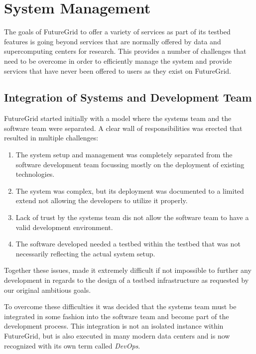 
\section{System Management}

The goals of FutureGrid to offer a variety of services as part of its
testbed features is going beyond services that are normally offered by
data and supercomputing centers for research. This provides a number
of challenges that need to be overcome in order to efficiently manage
the system and provide services that have never been offered to users
as they exist on FutureGrid.

\subsection{Integration of Systems and Development Team}

FutureGrid started initially with a model where the systems team and
the software team were separated. A clear wall of responsibilities was
erected that resulted in multiple challenges:

\begin{enumerate}

\item
The system setup and management was completely separated from
the software development team focussing mostly on the deployment of
existing technologies. 

\item
The system was complex, but its deployment was documented to a limited
extend not allowing the developers to utilize it properly.

\item 
Lack of trust by the systems team dis not allow the software team to
have a valid development environment.

\item
The software developed needed a testbed within the
testbed that was not necessarily reflecting the actual system setup.

\end{enumerate}

Together these issues, made it extremely difficult if not impossible to
further any development in regards to the design of a testbed
infrastructure as requested by our original ambitious goals. 

To overcome these difficulties it was decided that the systems team
must be integrated in some fashion into the software team and become
part of the development process. This integration is not an isolated
instance within FutureGrid, but is also executed in many modern data
centers and is now recognized with its own term called {\em DevOps}.

